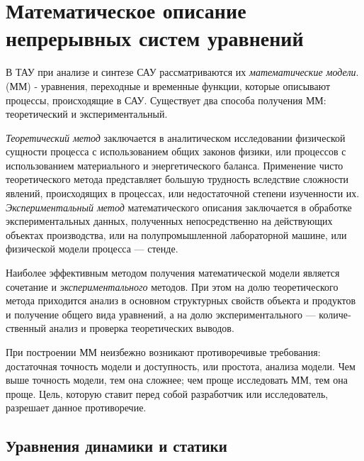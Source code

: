 \documentclass[../../TAU.tex]{subfiles}
\begin{document}
\chapter{Математическое описание непрерывных систем уравнений} 

    В ТАУ при анализе и синтезе САУ рассматриваются их {\it математические модели}.
     (ММ) - уравнения, переходные и временные функции, которые описывают процессы, происходящие в САУ.
    Существует два способа получения ММ: теоретический и экспериментальный.\par
    {\it Теоретический метод} заключается в аналитическом исследовании физической сущности процесса с использованием общих законов физики, или процессов с использованием материального и энергетического баланса. Применение чисто теоретического метода представляет большую трудность вследствие сложности явлений, происходящих в процессах, или недостаточной степени изученности их.
    {\it Экспериментальный метод} математического описания заклю­чается в обработке экспериментальных данных, полученных непо­средственно на действующих объектах производства, или на полу­промышленной лабораторной машине, или физической модели про­цесса — стенде.\par
    Наиболее эффективным методом получения математической модели является сочетание {} и {\it экспериментального} ме­тодов. При этом на долю теоретического метода приходится анализ в основном структурных свойств объекта и продуктов и получение общего вида уравнений, а на долю экспериментального — количе­ственный анализ и проверка теоретических выводов.\par
    При построении ММ неизбежно возникают противоречивые требования: достаточная точность модели и доступность, или простота, анализа модели. Чем выше точность модели, тем она сложнее; чем проще исследовать ММ, тем она проще. Цель, которую ставит перед собой разработчик или исследователь, разрешает данное противоречие. 


\section{Уравнения динамики и статики}
\end{document}
